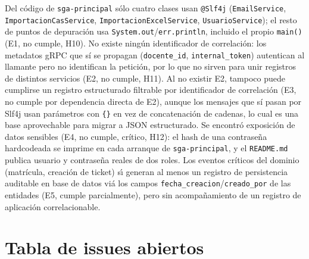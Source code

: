 \documentclass[11pt,a4paper]{article}
\begin{document}
    Del c\'odigo de \texttt{sga-principal} s\'olo cuatro clases usan \texttt{@Slf4j} (\texttt{EmailService}, \texttt{ImportacionCasService}, \texttt{ImportacionExcelService}, \texttt{UsuarioService}); el resto de puntos de depuraci\'on usa \texttt{System.out}/\texttt{err.println}, incluido el propio \texttt{main()} (E1, no cumple, H10). No existe ning\'un identificador de correlaci\'on: los metadatos gRPC que s\'i se propagan (\texttt{docente\_id}, \texttt{internal\_token}) autentican al llamante pero no identifican la petici\'on, por lo que no sirven para unir registros de distintos servicios (E2, no cumple, H11). Al no existir E2, tampoco puede cumplirse un registro estructurado filtrable por identificador de correlaci\'on (E3, no cumple por dependencia directa de E2), aunque los mensajes que s\'i pasan por Slf4j usan par\'ametros con \texttt{\{\}} en vez de concatenaci\'on de cadenas, lo cual es una base aprovechable para migrar a JSON estructurado. Se encontr\'o exposici\'on de datos sensibles (E4, no cumple, cr\'itico, H12): el hash de una contrase\~na hardcodeada se imprime en cada arranque de \texttt{sga-principal}, y el \texttt{README.md} publica usuario y contrase\~na reales de dos roles. Los eventos cr\'iticos del dominio (matr\'icula, creaci\'on de ticket) s\'{\i} generan al menos un registro de persistencia auditable en base de datos vi\'a los campos \texttt{fecha\_creacion}/\texttt{creado\_por} de las entidades (E5, cumple parcialmente), pero sin acompa\~namiento de un registro de aplicaci\'on correlacionable.

\section{Tabla de issues abiertos}
\label{sec:issues}
\end{document}
